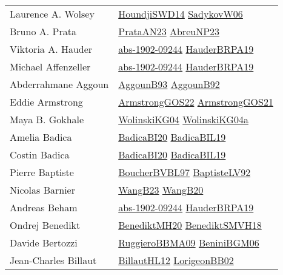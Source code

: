 {\begin{longtable}{p{4cm}p{20cm}}
Laurence A. Wolsey & \href{papers/HoundjiSWD14.pdf}{HoundjiSWD14}\cite{HoundjiSWD14} \href{}{SadykovW06}\cite{SadykovW06} \\
Bruno A. Prata & \href{articles/PrataAN23.pdf}{PrataAN23}\cite{PrataAN23} \href{}{AbreuNP23}\cite{AbreuNP23} \\
Viktoria A. Hauder & \href{articles/abs-1902-09244.pdf}{abs-1902-09244}\cite{abs-1902-09244} \href{articles/HauderBRPA19.pdf}{HauderBRPA19}\cite{HauderBRPA19} \\
Michael Affenzeller & \href{articles/abs-1902-09244.pdf}{abs-1902-09244}\cite{abs-1902-09244} \href{articles/HauderBRPA19.pdf}{HauderBRPA19}\cite{HauderBRPA19} \\
Abderrahmane Aggoun & \href{articles/AggounB93.pdf}{AggounB93}\cite{AggounB93} \href{}{AggounB92}\cite{AggounB92} \\
Eddie Armstrong & \href{papers/ArmstrongGOS22.pdf}{ArmstrongGOS22}\cite{ArmstrongGOS22} \href{papers/ArmstrongGOS21.pdf}{ArmstrongGOS21}\cite{ArmstrongGOS21} \\
Maya B. Gokhale & \href{papers/WolinskiKG04.pdf}{WolinskiKG04}\cite{WolinskiKG04} \href{}{WolinskiKG04a}\cite{WolinskiKG04a} \\
Amelia Badica & \href{}{BadicaBI20}\cite{BadicaBI20} \href{papers/BadicaBIL19.pdf}{BadicaBIL19}\cite{BadicaBIL19} \\
Costin Badica & \href{}{BadicaBI20}\cite{BadicaBI20} \href{papers/BadicaBIL19.pdf}{BadicaBIL19}\cite{BadicaBIL19} \\
Pierre Baptiste & \href{}{BoucherBVBL97}\cite{BoucherBVBL97} \href{papers/BaptisteLV92.pdf}{BaptisteLV92}\cite{BaptisteLV92} \\
Nicolas Barnier & \href{papers/WangB23.pdf}{WangB23}\cite{WangB23} \href{papers/WangB20.pdf}{WangB20}\cite{WangB20} \\
Andreas Beham & \href{articles/abs-1902-09244.pdf}{abs-1902-09244}\cite{abs-1902-09244} \href{articles/HauderBRPA19.pdf}{HauderBRPA19}\cite{HauderBRPA19} \\
Ondrej Benedikt & \href{articles/BenediktMH20.pdf}{BenediktMH20}\cite{BenediktMH20} \href{papers/BenediktSMVH18.pdf}{BenediktSMVH18}\cite{BenediktSMVH18} \\
Davide Bertozzi & \href{articles/RuggieroBBMA09.pdf}{RuggieroBBMA09}\cite{RuggieroBBMA09} \href{papers/BeniniBGM06.pdf}{BeniniBGM06}\cite{BeniniBGM06} \\
Jean{-}Charles Billaut & \href{papers/BillautHL12.pdf}{BillautHL12}\cite{BillautHL12} \href{}{LorigeonBB02}\cite{LorigeonBB02} \\

\end{longtable}}
